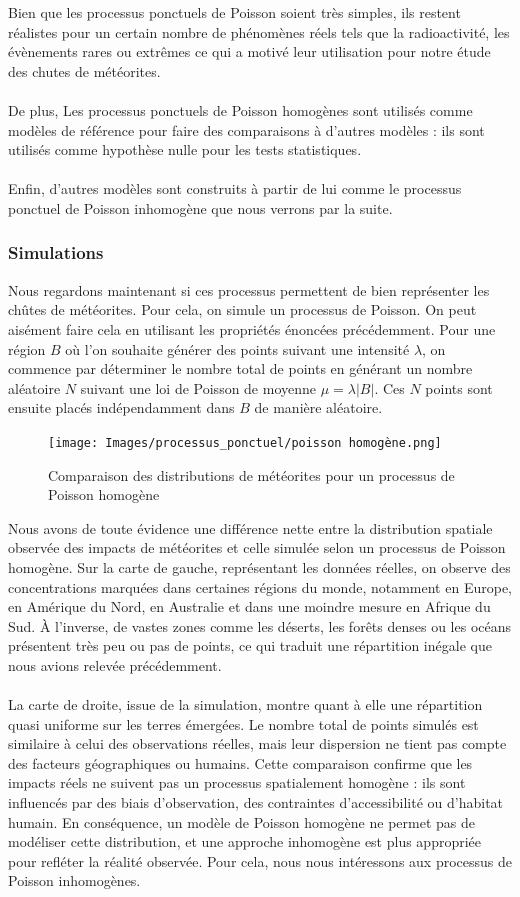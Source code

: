 \documentclass[12pt]{article}
\begin{document}
Bien que les processus ponctuels de Poisson soient très simples, ils restent réalistes pour un certain nombre de phénomènes réels tels que la radioactivité, les évènements rares ou  extrêmes ce qui a motivé leur utilisation pour notre étude des chutes de météorites.\\
\\
De plus, Les processus ponctuels de Poisson homogènes sont utilisés comme modèles de référence pour faire des comparaisons à d'autres modèles : ils sont utilisés comme hypothèse nulle pour les tests statistiques.\\
\\
Enfin, d'autres modèles sont construits à partir de lui comme le processus ponctuel de Poisson inhomogène que nous verrons par la suite.
\subsubsection*{Simulations}
Nous regardons maintenant si ces processus permettent de bien représenter les chûtes de météorites. Pour cela, on simule un processus de Poisson. On peut aisément faire cela en utilisant les propriétés énoncées précédemment. Pour une région $B$ où l'on souhaite générer des points suivant une intensité $\lambda$, on commence par déterminer le nombre total de points en générant un nombre aléatoire $N$ suivant une loi de Poisson de moyenne $\mu = \lambda|B|$. Ces $N$ points sont ensuite placés indépendamment dans $B$ de manière aléatoire.


\begin{figure}[H]
    \centering
    \texttt{[image: Images/processus\_ponctuel/poisson homogène.png]}
    \caption{Comparaison des distributions de météorites pour un processus de Poisson homogène}
\end{figure}
Nous avons de toute évidence une différence nette entre la distribution spatiale observée des impacts de météorites et celle simulée selon un processus de Poisson homogène. Sur la carte de gauche, représentant les données réelles, on observe des concentrations marquées dans certaines régions du monde, notamment en Europe, en Amérique du Nord, en Australie et dans une moindre mesure en Afrique du Sud. À l’inverse, de vastes zones comme les déserts, les forêts denses ou les océans présentent très peu ou pas de points, ce qui traduit une répartition inégale que nous avions relevée précédemment.\\
\\
La carte de droite, issue de la simulation, montre quant à elle une répartition quasi uniforme sur les terres émergées. Le nombre total de points simulés est similaire à celui des observations réelles, mais leur dispersion ne tient pas compte des facteurs géographiques ou humains. Cette comparaison confirme que les impacts réels ne suivent pas un processus spatialement homogène : ils sont influencés par des biais d’observation, des contraintes d’accessibilité ou d’habitat humain. En conséquence, un modèle de Poisson homogène ne permet pas de modéliser cette distribution, et une approche inhomogène est plus appropriée pour refléter la réalité observée. Pour cela, nous nous intéressons aux processus de Poisson inhomogènes.
\end{document}
